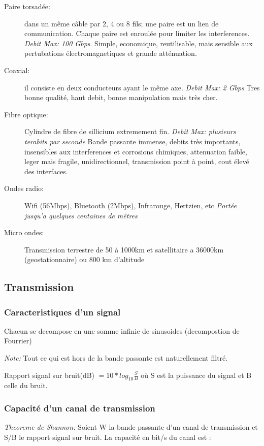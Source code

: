 \documentclass[a4paper, 12pt, french]{article}
\begin{document}
	\begin{description}
		\item[Paire torsadée:] dans un même câble par 2, 4 ou 8 fils; une paire est un lien de communication. Chaque paire est enroulée pour limiter les interferences. \emph{Debit Max: 100 Gbps}. Simple, economique, reutilisable, mais sensible aux pertubations électromagnetiques et grande atténuation.
		\item[Coaxial:] il consiste en deux conducteurs ayant le même axe. \emph{Debit Max: 2 Gbps} Tres bonne qualité, haut debit, bonne manipulation mais très cher.
		\item[Fibre optique:] Cylindre de fibre de sillicium extremement fin. \emph{Debit Max: plusieurs terabits par seconde} Bande passante immense, debits très importants, insensibles aux interferences et corrosions chimiques, attenuation faible, leger mais fragile, unidirectionnel, transmission point à point, cout élevé des interfaces.
		\item[Ondes radio:] Wifi (56Mbps), Bluetooth (2Mbps), Infrarouge, Hertzien, etc \emph{Portée jusqu'a quelques centaines de mêtres}
		\item[Micro ondes:] Transmission terrestre de 50 à 1000km et satellitaire a 36000km (geostationnaire) ou 800 km d'altitude
	\end{description}


	\subsection{Transmission}

	\subsubsection{Caracteristiques d'un signal}

	Chacun se decompose en une somme infinie de sinusoides (decompostion de Fourrier)

	\emph{Note:} Tout ce qui est hors de la bande passante est naturellement filtré.  

	Rapport signal sur bruit(dB) $ = 10 * log_{10} \frac{S}{B}$ où S est la puissance du signal et B celle du bruit.

	\subsubsection{Capacité d'un canal de transmission}

	\emph{Theoreme de Shannon:} Soient W la bande passante d'un canal de transmission et S/B le rapport signal sur bruit. La capacité en bit/s du canal est :
\end{document}
